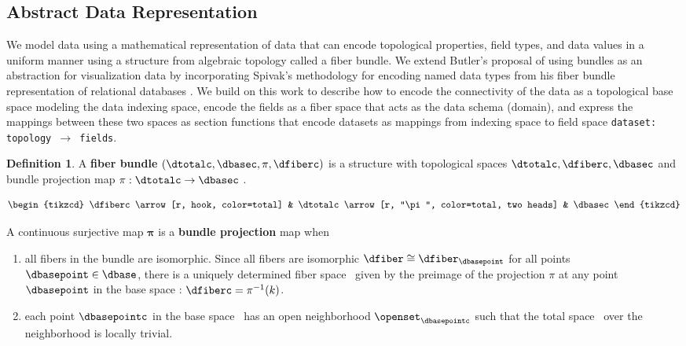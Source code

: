 \documentclass[journal]{IEEEtran}
\theoremstyle{definition}
\newtheorem{definition}{Definition}[section]
\theoremstyle{remark}
\begin{document}
\subsection{Abstract Data Representation}
\label{sec:atct:fiber-bundles}
We model data using a mathematical representation of data that can encode topological properties, field types, and data values in a uniform manner using a structure from algebraic topology called a fiber bundle. We extend Butler's proposal of using bundles as an abstraction for visualization data\cite{butlerVectorBundleClassesForm1992,butlerVisualizationModelBased1989} by incorporating Spivak's methodology for encoding named data types from his fiber bundle representation of relational databases \cite{spivakDatabasesAreCategories2010,spivakSimplicialDatabases2009}. We build on this work to describe how to encode the connectivity of the data as a topological \textcolor{base}{base space} modeling the data indexing space, encode the fields as a \textcolor{fiber}{fiber space} that acts as the data schema (domain), and express the mappings between these two spaces as \textcolor{section}{section} functions that encode datasets as mappings from indexing space to field space \texttt{dataset: topology $\rightarrow$ fields}.

\begin{definition}\label{def:fiber_bundle}
   A \textbf{fiber bundle} $(\dtotalc, \dbasec, \pi, \dfiberc)$ is a structure with topological spaces $\dtotalc, \dfiberc, \dbasec$ and  bundle projection map $\pi: \dtotalc \rightarrow \dbasec$ \cite{spanier1989algebraic}.

   \begin{equation} \label{eq:atct:fb:intro}
    \begin{tikzcd}
      \dfiberc \arrow[r, hook, color=total] & \dtotalc \arrow[r, "\pi", color=total, two heads] & \dbasec
      \end{tikzcd}
    \end{equation}

A continuous surjective map $\bm{\pi}$ is a \textbf{bundle projection} map when
\begin{enumerate}
  \item all fibers in the bundle are isomorphic. Since all fibers are isomorphic $\dfiber \cong \dfiber_{\dbasepoint}$ for all points $\dbasepoint \in \dbase$, there is a uniquely determined \textcolor{fiber}{fiber space} \dfiberc\ given by the preimage of the projection $\pi$ at any point $\dbasepoint$ in the \textcolor{base}{base space} \dbasec: $\dfiberc = \pi^{-1}(k)$.
  \item each point $\dbasepointc$ in the \textcolor{base}{base space} \dbasec\ has an open neighborhood $\openset_{\dbasepointc}$ such that the \textcolor{total}{total space} \dtotalc\ over the neighborhood is locally trivial.
\end{enumerate}
\end{definition}
\end{document}
